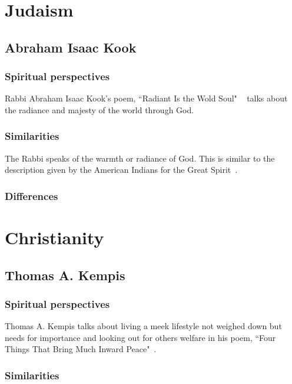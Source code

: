 \documentclass[11pt,a4paper]{scrartcl} %
\begin{document}
    \maketitle
    
    \begin{abstract}
  
    \end{abstract}
       
    \tableofcontents
    
    \section{Judaism}
    \subsection{Abraham Isaac Kook}
     \subsubsection{Spiritual perspectives}
     Rabbi Abraham Isaac Kook's poem, ``Radiant Is the Wold Soul" ~\citealp[pg. 39]{eknath} talks about the radiance and majesty of the world through God.
     \subsubsection{Similarities}
    The Rabbi speaks of the warmth or radiance of God. This is similar to the description given by the American Indians for the Great Spirit~\citealp[pg. 186]{eknath}.
     \subsubsection{Differences}
    \section{Christianity}
    \subsection{Thomas A. Kempis}
\subsubsection{Spiritual perspectives}
 Thomas A. Kempis talks about living a meek lifestyle not weighed down but needs for importance and looking out for others welfare in his poem, ``Four Things That Bring Much Inward Peace"~\citealp[pg. 199]{eknath}.
     \subsubsection{Similarities}
\end{document}
